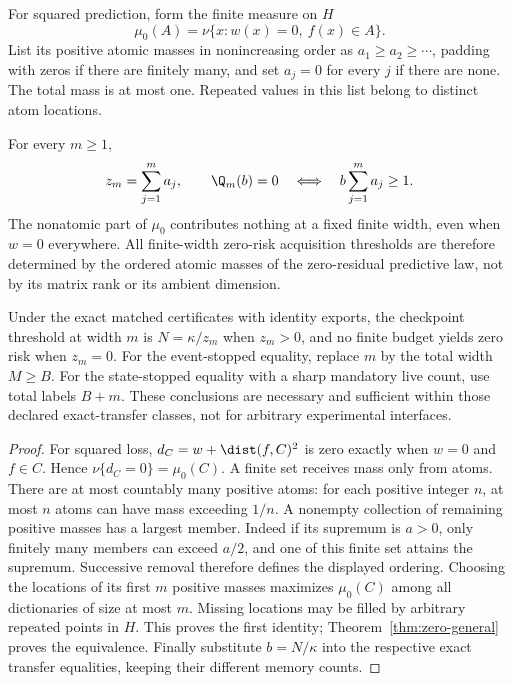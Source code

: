 For squared prediction, form the finite measure on $H$
\[
 \mu_0(A)=\nu\{x:w(x)=0,\ f(x)\in A\}.
\]
List its positive atomic masses in nonincreasing order as $a_1\ge a_2\ge\cdots$, padding with zeros if there are finitely many, and set $a_j=0$ for every $j$ if there are none. The total mass is at most one. Repeated values in this list belong to distinct atom locations.

\begin{theorem}\label{thm:zero-spectrum}
For every $m\ge1$,
\begin{equation}\label{eq:atomic-zero-spectrum}
 z_m=\sum_{j=1}^m a_j,\qquad
 \Q_m(b)=0\quad\Longleftrightarrow\quad
 b\sum_{j=1}^m a_j\ge1.
\end{equation}
The nonatomic part of $\mu_0$ contributes nothing at a fixed finite width, even when $w=0$ everywhere. All finite-width zero-risk acquisition thresholds are therefore determined by the ordered atomic masses of the zero-residual predictive law, not by its matrix rank or its ambient dimension.

Under the exact matched certificates with identity exports, the checkpoint threshold at width $m$ is $N=\kappa/z_m$ when $z_m>0$, and no finite budget yields zero risk when $z_m=0$. For the event-stopped equality, replace $m$ by the total width $M\ge B$. For the state-stopped equality with a sharp mandatory live count, use total labels $B+m$. These conclusions are necessary and sufficient within those declared exact-transfer classes, not for arbitrary experimental interfaces.
\end{theorem}
\begin{proof}
For squared loss, $d_C=w+\dist(f,C)^2$ is zero exactly when $w=0$ and $f\in C$. Hence $\nu\{d_C=0\}=\mu_0(C)$. A finite set receives mass only from atoms. There are at most countably many positive atoms: for each positive integer $n$, at most $n$ atoms can have mass exceeding $1/n$. A nonempty collection of remaining positive masses has a largest member. Indeed if its supremum is $a>0$, only finitely many members can exceed $a/2$, and one of this finite set attains the supremum. Successive removal therefore defines the displayed ordering. Choosing the locations of its first $m$ positive masses maximizes $\mu_0(C)$ among all dictionaries of size at most $m$. Missing locations may be filled by arbitrary repeated points in $H$. This proves the first identity; Theorem~\ref{thm:zero-general} proves the equivalence. Finally substitute $b=N/\kappa$ into the respective exact transfer equalities, keeping their different memory counts.
\end{proof}

